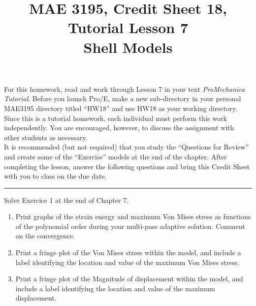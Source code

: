 \documentclass[12pt]{article}
\title{MAE 3195, Credit Sheet 18, Tutorial Lesson 7\\
Shell Models}
\date{}
\begin{document}
\maketitle

For this homework, read and work through Lesson 7 in your text \textit{ProMechanica Tutorial}. Before you launch Pro/E, make a new sub-directory in your personal MAE3195 directory titled ``HW18'' and use HW18 as your working directory.\\

Since this is a tutorial homework, each individual must perform this work independently. You are encouraged, however, to discuss the assignment with other students as necessary.\\

It is recommended (but not required) that you study the ``Questions for Review'' and create some of the ``Exercise'' models at the end of the chapter. After completing the lesson, answer the following questions and bring this Credit Sheet with you to class on the due date.

\vspace{.25in} \hrule \vspace{.25in}

Solve Exercice 1 at the end of Chapter 7.

\begin{enumerate}
	\item Print graphs of the strain energy and maximum Von Mises stress as functions of the polynomial order during your multi-pass adaptive solution. Comment on the convergence.
	\vspace{2.in}
	
	\item Print a fringe plot of the Von Mises stress within the model, and include a label identifying the location and value of the maximum Von Mises stress.
	\vspace{.25in}

	\item Print a fringe plot of the Magnitude of displacement within the model, and include a label identifying the location and value of the maximum displacement.

\end{enumerate}
\end{document}
